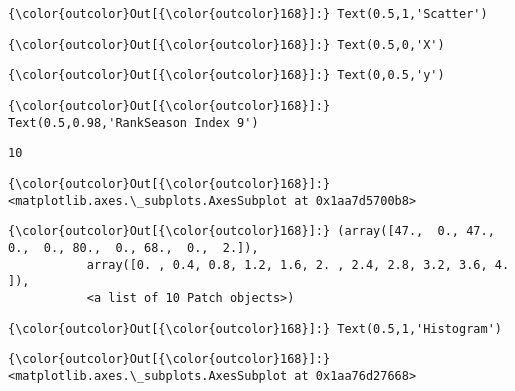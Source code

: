 \documentclass[11pt]{article}
\begin{document}
\begin{Verbatim}[commandchars=\\\{\}]
{\color{outcolor}Out[{\color{outcolor}168}]:} Text(0.5,1,'Scatter')
\end{Verbatim}
            
\begin{Verbatim}[commandchars=\\\{\}]
{\color{outcolor}Out[{\color{outcolor}168}]:} Text(0.5,0,'X')
\end{Verbatim}
            
\begin{Verbatim}[commandchars=\\\{\}]
{\color{outcolor}Out[{\color{outcolor}168}]:} Text(0,0.5,'y')
\end{Verbatim}
            
\begin{Verbatim}[commandchars=\\\{\}]
{\color{outcolor}Out[{\color{outcolor}168}]:} Text(0.5,0.98,'RankSeason Index 9')
\end{Verbatim}
            
    \begin{Verbatim}[commandchars=\\\{\}]
10

    \end{Verbatim}

\begin{Verbatim}[commandchars=\\\{\}]
{\color{outcolor}Out[{\color{outcolor}168}]:} <matplotlib.axes.\_subplots.AxesSubplot at 0x1aa7d5700b8>
\end{Verbatim}
            
\begin{Verbatim}[commandchars=\\\{\}]
{\color{outcolor}Out[{\color{outcolor}168}]:} (array([47.,  0., 47.,  0.,  0., 80.,  0., 68.,  0.,  2.]),
           array([0. , 0.4, 0.8, 1.2, 1.6, 2. , 2.4, 2.8, 3.2, 3.6, 4. ]),
           <a list of 10 Patch objects>)
\end{Verbatim}
            
\begin{Verbatim}[commandchars=\\\{\}]
{\color{outcolor}Out[{\color{outcolor}168}]:} Text(0.5,1,'Histogram')
\end{Verbatim}
            
\begin{Verbatim}[commandchars=\\\{\}]
{\color{outcolor}Out[{\color{outcolor}168}]:} <matplotlib.axes.\_subplots.AxesSubplot at 0x1aa76d27668>
\end{Verbatim}
            
\end{document}

